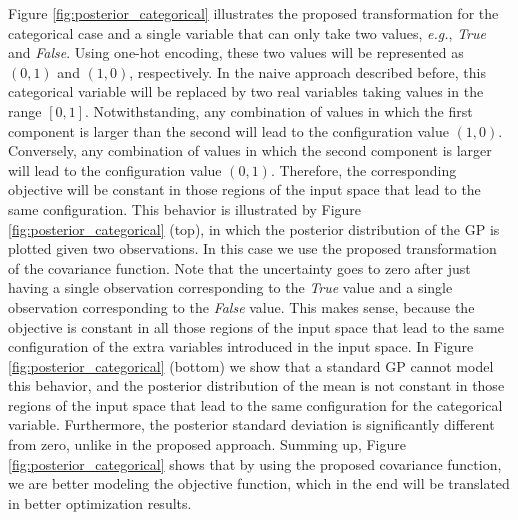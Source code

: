 Figure \ref{fig:posterior_categorical} illustrates the proposed transformation for the categorical case and a 
single variable that can only take two values, \emph{e.g.}, \emph{True} and \emph{False}. Using one-hot encoding,
these two values will be represented as $(0,1)$ and $(1,0)$, respectively. In the naive approach described before, this 
categorical variable will be replaced by two real variables taking values in the range $[0,1]$. Notwithstanding, any 
combination of values in which the first component is larger than the second will lead to the configuration value $(1,0)$.
Conversely, any combination of values in which the second component is larger will lead to the configuration value $(0,1)$.
Therefore, the corresponding objective will be constant in those regions of the input space that lead to the same configuration. 
This behavior is illustrated by Figure \ref{fig:posterior_categorical} (top), in which the posterior distribution of the GP is plotted 
given two observations. In this case we use the proposed transformation of the covariance function.
Note that the uncertainty goes to zero after just having a single observation corresponding to 
the \emph{True} value and a single observation corresponding to the \emph{False} value. This makes sense, because 
the objective is constant in all those regions of the input space that lead to the same configuration of 
the extra variables introduced in the input space. In Figure \ref{fig:posterior_categorical} (bottom) we show 
that a standard GP cannot model this behavior, and the posterior distribution of the mean is not constant in 
those regions of the input space that lead to the same configuration for the categorical variable. 
Furthermore, the posterior standard deviation is significantly different from zero, unlike in the proposed approach. 
Summing up, Figure \ref{fig:posterior_categorical} shows that by using the proposed covariance function, we are
better modeling the objective function, which in the end will be translated in better optimization results.



